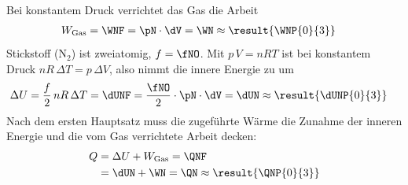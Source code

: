 Bei konstantem Druck verrichtet das Gas die Arbeit
\begin{align}
 W_\text{Gas} &= \WNF = \pN\cdot\dV = \WN \approx \result{\WNP{0}{3}}
\end{align}
Stickstoff (N$_2$) ist zweiatomig, $f = \fNO$. Mit $p\,V = nRT$ ist bei konstantem Druck $nR\,\Delta T = p\,\Delta V$, also nimmt die innere Energie zu um
\begin{align}
 \Delta U &= \frac{f}{2}\,nR\,\Delta T = \dUNF = \frac{\fNO}{2}\cdot\pN\cdot\dV = \dUN \approx \result{\dUNP{0}{3}}
\end{align}
Nach dem ersten Hauptsatz muss die zugeführte Wärme die Zunahme der inneren Energie und die vom Gas verrichtete Arbeit decken:
\begin{align}
 Q &= \Delta U + W_\text{Gas} = \QNF \\
   &= \dUN+\WN = \QN \approx \result{\QNP{0}{3}}
\end{align}
